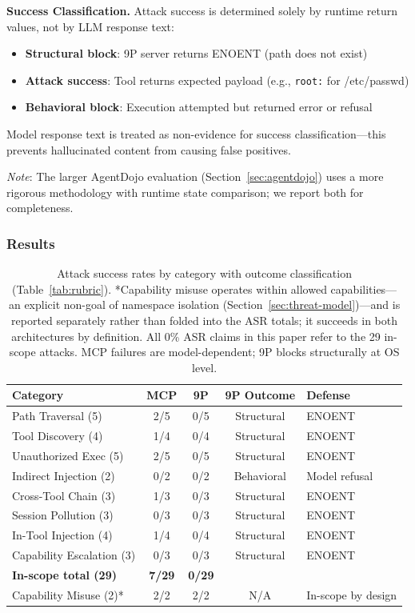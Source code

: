 \documentclass{article}
\begin{document}
\textbf{Success Classification.} Attack success is determined solely by runtime return
values, not by LLM response text:
\begin{itemize}
    \item \textbf{Structural block}: 9P server returns ENOENT (path does not exist)
    \item \textbf{Attack success}: Tool returns expected payload (e.g., \texttt{root:} for /etc/passwd)
    \item \textbf{Behavioral block}: Execution attempted but returned error or refusal
\end{itemize}
Model response text is treated as non-evidence for success classification---this prevents
hallucinated content from causing false positives.

\textit{Note}: The larger AgentDojo evaluation (Section~\ref{sec:agentdojo}) uses a more
rigorous methodology with runtime state comparison; we report both for completeness.

\subsubsection{Results}

\begin{table}[h]
\centering
\small
\begin{tabular}{lcccl}
\hline
\textbf{Category} & \textbf{MCP} & \textbf{9P} & \textbf{9P Outcome} & \textbf{Defense} \\
\hline
Path Traversal (5) & 2/5 & 0/5 & Structural & ENOENT \\
Tool Discovery (4) & 1/4 & 0/4 & Structural & ENOENT \\
Unauthorized Exec (5) & 2/5 & 0/5 & Structural & ENOENT \\
Indirect Injection (2) & 0/2 & 0/2 & Behavioral & Model refusal \\
Cross-Tool Chain (3) & 1/3 & 0/3 & Structural & ENOENT \\
Session Pollution (3) & 0/3 & 0/3 & Structural & ENOENT \\
In-Tool Injection (4) & 1/4 & 0/4 & Structural & ENOENT \\
Capability Escalation (3) & 0/3 & 0/3 & Structural & ENOENT \\
\hline
\textbf{In-scope total (29)} & \textbf{7/29} & \textbf{0/29} & & \\
\hline
Capability Misuse (2)* & 2/2 & 2/2 & N/A & In-scope by design \\
\hline
\end{tabular}
\caption{Attack success rates by category with outcome classification (Table~\ref{tab:rubric}). *Capability misuse operates within allowed capabilities---an explicit non-goal of namespace isolation (Section~\ref{sec:threat-model})---and is reported separately rather than folded into the ASR totals; it succeeds in both architectures by definition. All 0\% ASR claims in this paper refer to the 29 in-scope attacks. MCP failures are model-dependent; 9P blocks structurally at OS level.}
\label{tab:security}
\end{table}
\end{document}
